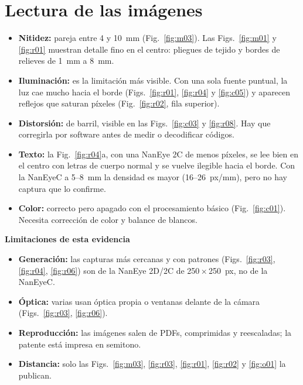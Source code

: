 \documentclass[11pt,a4paper]{article}
\begin{document}
\section{Lectura de las imágenes}
\begin{itemize}
  \item \textbf{Nitidez:} pareja entre 4 y 10~mm (Fig.~\ref{fig:m03}). Las Figs.~\ref{fig:m01} y \ref{fig:r01} muestran detalle fino en el centro: pliegues de tejido y bordes de relieves de 1~mm a 8~mm.
  \item \textbf{Iluminación:} es la limitación más visible. Con una sola fuente puntual, la luz cae mucho hacia el borde (Figs.~\ref{fig:r01}, \ref{fig:r04} y \ref{fig:c05}) y aparecen reflejos que saturan píxeles (Fig.~\ref{fig:r02}, fila superior).
  \item \textbf{Distorsión:} de barril, visible en las Figs.~\ref{fig:c03} y \ref{fig:r08}. Hay que corregirla por software antes de medir o decodificar códigos.
  \item \textbf{Texto:} la Fig.~\ref{fig:r04}a, con una NanEye 2C de menos píxeles, se lee bien en el centro con letras de cuerpo normal y se vuelve ilegible hacia el borde. Con la NanEyeC a 5--8~mm la densidad es mayor (16--26~px/mm), pero no hay captura que lo confirme.
  \item \textbf{Color:} correcto pero apagado con el procesamiento básico (Fig.~\ref{fig:c01}). Necesita corrección de color y balance de blancos.
\end{itemize}

\textbf{Limitaciones de esta evidencia}
\begin{itemize}
  \item \textbf{Generación:} las capturas más cercanas y con patrones (Figs.~\ref{fig:r03}, \ref{fig:r04}, \ref{fig:r06}) son de la NanEye 2D/2C de 250\,$\times$\,250~px, no de la NanEyeC.
  \item \textbf{Óptica:} varias usan óptica propia o ventanas delante de la cámara (Figs.~\ref{fig:r03}, \ref{fig:r06}).
  \item \textbf{Reproducción:} las imágenes salen de PDFs, comprimidas y reescaladas; la patente está impresa en semitono.
  \item \textbf{Distancia:} solo las Figs.~\ref{fig:m03}, \ref{fig:r03}, \ref{fig:r01}, \ref{fig:r02} y \ref{fig:o01} la publican.
\end{itemize}

\end{document}

